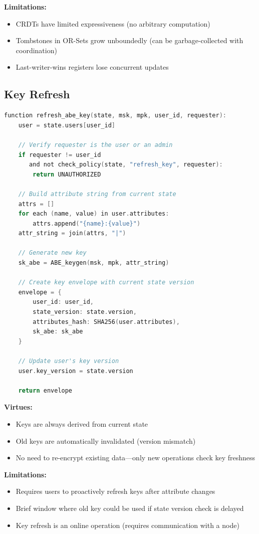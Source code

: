 \documentclass[sigconf,nonacm]{acmart}
\begin{document}
\textbf{Limitations:}
\begin{itemize}
    \item CRDTs have limited expressiveness (no arbitrary computation)
    \item Tombstones in OR-Sets grow unboundedly (can be garbage-collected with coordination)
    \item Last-writer-wins registers lose concurrent updates
\end{itemize}

\subsection{Key Refresh}

\begin{lstlisting}[language=C]
function refresh_abe_key(state, msk, mpk, user_id, requester):
    user = state.users[user_id]

    // Verify requester is the user or an admin
    if requester != user_id
       and not check_policy(state, "refresh_key", requester):
        return UNAUTHORIZED

    // Build attribute string from current state
    attrs = []
    for each (name, value) in user.attributes:
        attrs.append("{name}:{value}")
    attr_string = join(attrs, "|")

    // Generate new key
    sk_abe = ABE_keygen(msk, mpk, attr_string)

    // Create key envelope with current state version
    envelope = {
        user_id: user_id,
        state_version: state.version,
        attributes_hash: SHA256(user.attributes),
        sk_abe: sk_abe
    }

    // Update user's key version
    user.key_version = state.version

    return envelope
\end{lstlisting}

\textbf{Virtues:}
\begin{itemize}
    \item Keys are always derived from current state
    \item Old keys are automatically invalidated (version mismatch)
    \item No need to re-encrypt existing data---only new operations check key freshness
\end{itemize}

\textbf{Limitations:}
\begin{itemize}
    \item Requires users to proactively refresh keys after attribute changes
    \item Brief window where old key could be used if state version check is delayed
    \item Key refresh is an online operation (requires communication with a node)
\end{itemize}
\end{document}
